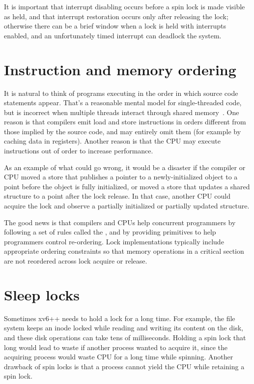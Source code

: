 It is important that interrupt disabling occurs before a spin lock is made
visible as held, and that interrupt restoration occurs only after releasing
the lock; otherwise there can be a brief window when a lock is held with
interrupts enabled, and an unfortunately timed interrupt can deadlock the system.

\section{Instruction and memory ordering}

It is natural to think of programs executing in the order
in which source code statements appear.
That's a reasonable mental model for single-threaded
code, but is incorrect when
multiple threads interact through shared memory~\cite{riscv:user,boehm04}.
One reason is that compilers emit load and store
instructions in orders different from those implied
by the source code, and may entirely omit them
(for example by caching data in registers).
Another reason is that the CPU may execute instructions
out of order to increase performance.

As an example of what could go wrong,
it would be a disaster if the compiler or CPU moved a store that publishes
a pointer to a newly-initialized object to a point before the object is
fully initialized, or moved a store that updates a shared structure to a
point after the lock release.
In that case, another CPU could acquire the lock and observe a partially
initialized or partially updated structure.

The good news is that compilers and CPUs help concurrent programmers
by following a set of rules called the , and
by providing primitives to help programmers control re-ordering.
Lock implementations typically include appropriate ordering constraints
so that memory operations in a critical section are not reordered across
lock acquire or release.

\section{Sleep locks}

Sometimes xv6++ needs to hold a lock for a long time. For example, the
file system keeps an inode locked while reading and writing its content
on the disk, and these disk operations can take tens of milliseconds.
Holding a spin lock that long would lead to waste if another process wanted to
acquire it, since the acquiring process would waste CPU for a long time while
spinning. Another drawback of spin locks is that a process cannot yield the CPU
while retaining a spin lock.

